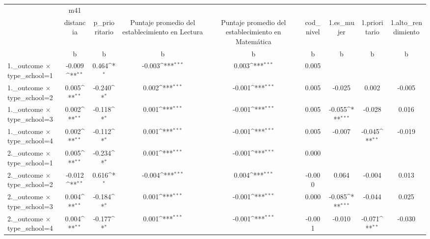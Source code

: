 {
\def\sym#1{\ifmmode^{#1}\else\(^{#1}\)\fi}
\begin{tabular}{l*{8}{c}}
\toprule
                &      m41         &                  &                  &                  &                  &                  &                  &                  \\
                &distancia         &p\_prioritario         &Puntaje promedio del establecimiento en Lectura         &Puntaje promedio del establecimiento en Matemática         &cod\_nivel         &1.es\_mujer         &1.prioritario         &1.alto\_rendimiento         \\
                &        b         &        b         &        b         &        b         &        b         &        b         &        b         &        b         \\
\midrule
1.\_outcome $\times$ type\_school=1&   -0.009\sym{**} &    0.464\sym{*}  &   -0.003\sym{***}&    0.003\sym{***}&    0.005         &                  &                  &                  \\
1.\_outcome $\times$ type\_school=2&    0.005\sym{**} &   -0.240\sym{*}  &    0.002\sym{***}&   -0.001\sym{***}&    0.005         &   -0.025         &    0.002         &   -0.005         \\
1.\_outcome $\times$ type\_school=3&    0.002\sym{**} &   -0.118\sym{*}  &    0.001\sym{***}&   -0.001\sym{***}&    0.005         &   -0.055\sym{***}&   -0.028         &    0.016         \\
1.\_outcome $\times$ type\_school=4&    0.002\sym{**} &   -0.112\sym{*}  &    0.001\sym{***}&   -0.001\sym{***}&    0.005         &   -0.007         &   -0.045\sym{**} &   -0.019         \\
2.\_outcome $\times$ type\_school=1&    0.005\sym{**} &   -0.234\sym{*}  &    0.001\sym{***}&   -0.001\sym{***}&    0.000         &                  &                  &                  \\
2.\_outcome $\times$ type\_school=2&   -0.012\sym{**} &    0.616\sym{*}  &   -0.004\sym{***}&    0.004\sym{***}&   -0.000         &    0.064         &   -0.004         &    0.013         \\
2.\_outcome $\times$ type\_school=3&    0.004\sym{**} &   -0.184\sym{*}  &    0.001\sym{***}&   -0.001\sym{***}&    0.000         &   -0.085\sym{***}&   -0.044         &    0.025         \\
2.\_outcome $\times$ type\_school=4&    0.004\sym{**} &   -0.177\sym{*}  &    0.001\sym{***}&   -0.001\sym{***}&   -0.001         &   -0.010         &   -0.071\sym{**} &   -0.030         \\

\end{tabular}}
